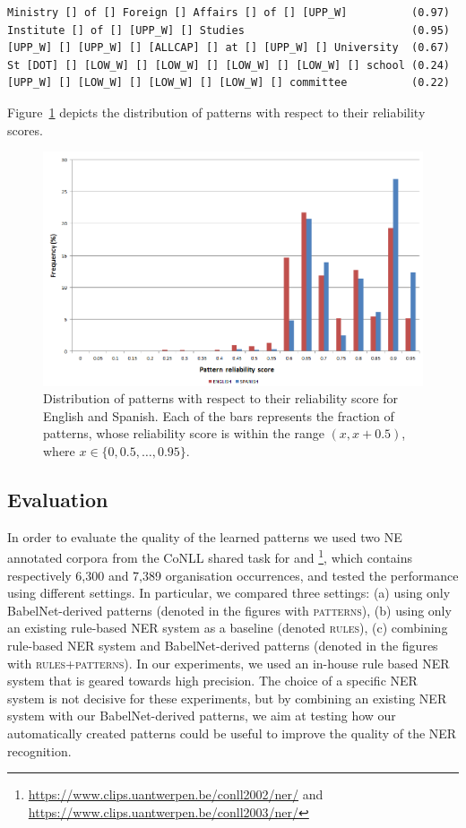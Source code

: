 \documentclass[output=paper]{langsci/langscibook}
\begin{document}
\ea\label{ex:jacexamplesrelscores}\small
\begin{verbatim}
Ministry [] of [] Foreign [] Affairs [] of [] [UPP_W]          (0.97)
Institute [] of [] [UPP_W] [] Studies                          (0.95)
[UPP_W] [] [UPP_W] [] [ALLCAP] [] at [] [UPP_W] [] University  (0.67)
St [DOT] [] [LOW_W] [] [LOW_W] [] [LOW_W] [] [LOW_W] [] school (0.24)
[UPP_W] [] [LOW_W] [] [LOW_W] [] [LOW_W] [] committee          (0.22)
\end{verbatim}
\z

Figure~\ref{jac:pattern-distr} depicts the distribution of patterns with
respect to their reliability scores.

\begin{figure}[H]
\includegraphics[width=.95\textwidth]{figures/patterns-distr.png}
\caption{\label{jac:pattern-distr}Distribution of patterns with respect to their reliability score for English and Spanish. Each of the bars represents the fraction of patterns, whose reliability score is within the range $(x,x+0.5)$, where $x \in \{0,0.5,\ldots{},0.95\}$.}
\end{figure}

\subsection{Evaluation}
In order to evaluate the quality of the learned patterns we used two NE annotated corpora from the CoNLL shared task for  and \footnote{\url{https://www.clips.uantwerpen.be/conll2002/ner/} and \url{https://www.clips.uantwerpen.be/conll2003/ner/}}, which contains respectively 6,300 and 7,389 organisation occurrences, and tested the performance using different settings. In particular, we compared three settings: (a) using only BabelNet-derived patterns (denoted in the figures with \textsc{patterns}),  (b) using only an existing rule-based NER system as a baseline (denoted \textsc{rules}), (c) combining rule-based NER system and BabelNet-derived patterns (denoted in the figures with \textsc{rules+patterns}).
In our experiments, we used an in-house rule based NER system \citep{steinberger-11, ehrmann-15} that is geared towards high precision. The choice of a specific NER system is not decisive for these experiments, but by combining an existing NER system with our BabelNet-derived patterns, we aim at testing how our automatically created patterns could be useful to improve the quality of the NER recognition.
\end{document}
